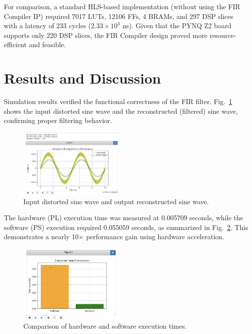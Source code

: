 \documentclass[conference]{IEEEtran}
\begin{document}
	For comparison, a standard HLS-based implementation (without using the FIR Compiler IP) required 7017 LUTs, 12106 FFs, 4 BRAMs, and 297 DSP slices with a latency of 233 cycles ($2.33 \times 10^3$ ns). Given that the PYNQ Z2 board supports only 220 DSP slices, the FIR Compiler design proved more resource-efficient and feasible.
	
	\section{Results and Discussion}
	Simulation results verified the functional correctness of the FIR filter. Fig.~\ref{fig_result1} shows the input distorted sine wave and the reconstructed (filtered) sine wave, confirming proper filtering behavior.
	
	\begin{figure}[htbp]
		\centerline{\includegraphics[width=0.47\textwidth]{result1.png}}
		\caption{Input distorted sine wave and output reconstructed sine wave.}
		\label{fig_result1}
	\end{figure}
	
	The hardware (PL) execution time was measured at 0.005709 seconds, while the software (PS) execution required 0.055059 seconds, as summarized in Fig.~\ref{fig_result2}. This demonstrates a nearly 10$\times$ performance gain using hardware acceleration.
	
	\begin{figure}[htbp]
		\centerline{\includegraphics[width=0.47\textwidth]{result2.png}}
		\caption{Comparison of hardware and software execution times.}
		\label{fig_result2}
	\end{figure}
	
\end{document}
